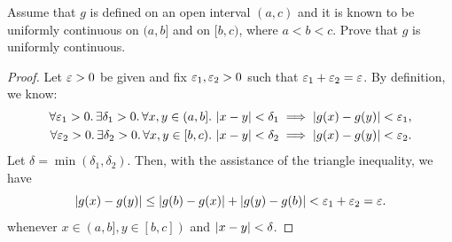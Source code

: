 \begin{problem}
  Assume that $g$ is defined on an open interval $(a, c)$ and it is known to be
  uniformly continuous on $(a, b]$ and on $[b, c)$, where $a < b < c$. Prove
  that $g$ is uniformly continuous.

  \begin{proof}
    Let $\varepsilon > 0$ be given and fix $\varepsilon_{1}, \varepsilon_{2} > 0$ such that
    $\varepsilon_{1} + \varepsilon_{2} = \varepsilon$. By definition, 
    we know:
    \begin{align*}
      \forall \varepsilon_{1} > 0.\, \exists \delta_{1} > 0.\, \forall x, y \in (a, b].\, \left\lvert x - y \right\rvert < \delta_{1} \implies \left\lvert g(x) - g(y) \right\rvert < \varepsilon_{1},\\
      \forall \varepsilon_{2} > 0.\, \exists \delta_{2} > 0.\, \forall x, y \in [b, c).\, \left\lvert x - y \right\rvert < \delta_{2} \implies \left\lvert g(x) - g(y) \right\rvert < \varepsilon_{2}.
    \end{align*}
    Let $\delta =
    \min{(\delta_{1}, \delta_{2})}$. Then, with the assistance
    of the triangle inequality, we have
    \[
      \left\lvert g(x) - g(y) \right\rvert \leq \left\lvert g(b) - g(x) \right\rvert + \left\lvert g(y) - g(b) \right\rvert < \varepsilon_{1} + \varepsilon_{2} = \varepsilon.
    \]
    whenever $x \in (a, b], y \in [b, c])$ and $\left\lvert x - y \right\rvert < \delta$.
  \end{proof}
\end{problem}

